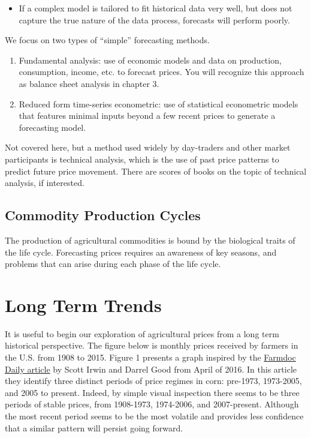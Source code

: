 \documentclass[
  letterpaper,
  DIV=11,
  numbers=noendperiod]{scrreprt}
\providecommand{\tightlist}{%
  \setlength{\itemsep}{0pt}\setlength{\parskip}{0pt}}\usepackage{longtable,booktabs,array}
\begin{document}
\begin{enumerate}
\begin{itemize}
    \begin{itemize}
    \tightlist
    \item
      If a complex model is tailored to fit historical data very well,
      but does not capture the true nature of the data process,
      forecasts will perform poorly.
    \end{itemize}
  \end{itemize}
\end{enumerate}

We focus on two types of ``simple'' forecasting methods.

\begin{enumerate}
\def\labelenumi{\arabic{enumi}.}
\item
  Fundamental analysis: use of economic models and data on production,
  consumption, income, etc. to forecast prices. You will recognize this
  approach as balance sheet analysis in chapter 3.
\item
  Reduced form time-series econometric: use of statistical econometric
  models that features minimal inputs beyond a few recent prices to
  generate a forecasting model.
\end{enumerate}

Not covered here, but a method used widely by day-traders and other
market participants is technical analysis, which is the use of past
price patterns to predict future price movement. There are scores of
books on the topic of technical analysis, if interested.

\hypertarget{commodity-production-cycles}{%
\subsection{Commodity Production
Cycles}\label{commodity-production-cycles}}

The production of agricultural commodities is bound by the biological
traits of the life cycle. Forecasting prices requires an awareness of
key seasons, and problems that can arise during each phase of the life
cycle.

\hypertarget{long-term-trends}{%
\section{Long Term Trends}\label{long-term-trends}}

It is useful to begin our exploration of agricultural prices from a long
term historical perspective. The figure below is monthly prices received
by farmers in the U.S. from 1908 to 2015. Figure 1 presents a graph
inspired by the
\href{http://farmdocdaily.illinois.edu/2016/04/new-era-of-corn-and-soybean-prices.html}{Farmdoc
Daily article} by Scott Irwin and Darrel Good from April of 2016. In
this article they identify three distinct periods of price regimes in
corn: pre-1973, 1973-2005, and 2005 to present. Indeed, by simple visual
inspection there seems to be three periods of stable prices, from
1908-1973, 1974-2006, and 2007-present. Although the most recent period
seems to be the most volatile and provides less confidence that a
similar pattern will persist going forward.
\end{document}
